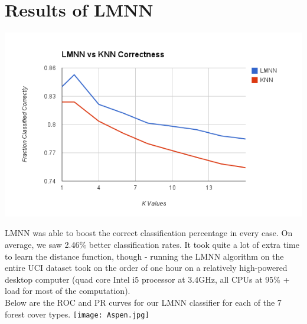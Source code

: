 \documentclass[11pt]{article}
\begin{document}
\section*{Results of LMNN}
\includegraphics[scale=.75]{knnvslmnn.png}

LMNN was able to boost the correct classification percentage in every case. On average, we saw 2.46\% better classification rates. It took quite a lot of extra time to learn the distance function, though - running the LMNN algorithm on the entire UCI dataset took on the order of one hour on a relatively high-powered desktop computer (quad core Intel i5 processor at 3.4GHz, all CPUs at 95\% + load for most of the computation).
\\
Below are the ROC and PR curves for our LMNN classifier for each of the 7 forest cover types.
\texttt{[image: Aspen.jpg]}
\end{document}
